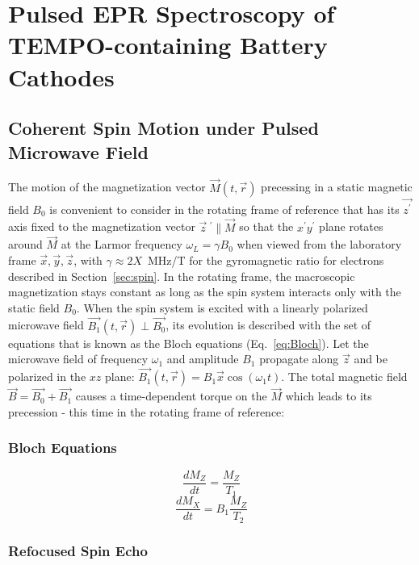\chapter{Pulsed EPR Spectroscopy of TEMPO-containing Battery Cathodes}
\label{ch:pulsed_epr}

\section{Coherent Spin Motion under Pulsed Microwave Field}
The motion of the magnetization vector $\vec{M}(t,\vec{r})$ precessing in a static magnetic field $B_0$ is convenient to consider in the rotating frame of reference that has its $\vec{z^{\prime}}$ axis fixed to the magnetization vector ${\vec{z}}~^{\prime}\parallel\vec{M}$ so that the $x^{\prime} y^{\prime}$ plane rotates around $\vec{M}$ at the Larmor frequency $\omega_L=\gamma B_0$ when viewed from the laboratory frame $\vec{x},\vec{y},\vec{z}$, with $\gamma\approx2X$~MHz/T for the gyromagnetic ratio for electrons described in Section~\ref{sec:spin}. In the rotating frame, the macroscopic magnetization stays constant as long as the spin system interacts only with the static field $B_0$. When the spin system is excited with a linearly polarized microwave field $\vec{B_1}(t,\vec{r})\perp\vec{B_0}$, its evolution is described with the set of equations that is known as the Bloch equations (Eq.~\ref{eq:Bloch}). Let the microwave field of frequency $\omega_1$ and amplitude $B_1$ propagate along $\vec{z}$ and be polarized in the $xz$ plane: $\vec{B_1}(t,\vec{r})=B_1\vec{x}\cos\left(\omega_1t\right)$. The total magnetic field $\vec{B}=\vec{B_0}+\vec{B_1}$ causes a time-dependent torque on the $\vec{M}$ which leads to its precession - this time in the rotating frame of reference:

\subsection{Bloch Equations}
\begin{equation}
\label{eq:Bloch}
\frac{dM_Z}{dt} = \frac{M_Z}{T_1}
\end{equation}
\begin{equation}
\frac{dM_X}{dt} = B_1\frac{M_Z}{T_2}
\end{equation}



\subsection{Refocused Spin Echo}
